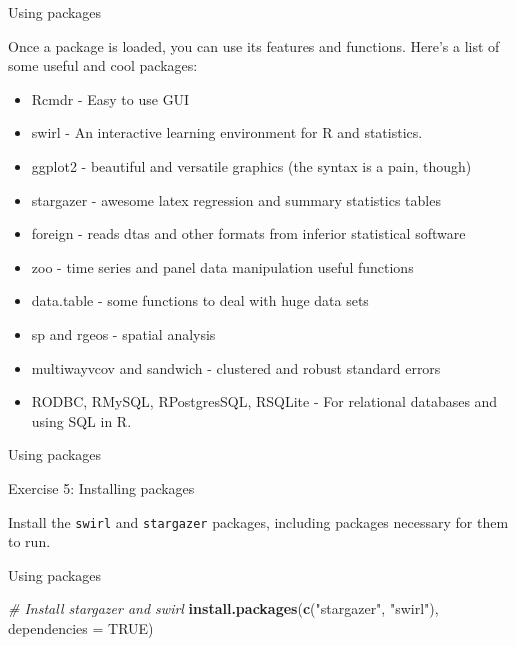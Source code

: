 \documentclass[ignorenonframetext,]{beamer}
\newenvironment{Shaded}{\begin{snugshade}}{\end{snugshade}}
\newcommand{\KeywordTok}[1]{\textcolor[rgb]{0.13,0.29,0.53}{\textbf{#1}}}
\newcommand{\DataTypeTok}[1]{\textcolor[rgb]{0.13,0.29,0.53}{#1}}
\newcommand{\StringTok}[1]{\textcolor[rgb]{0.31,0.60,0.02}{#1}}
\newcommand{\CommentTok}[1]{\textcolor[rgb]{0.56,0.35,0.01}{\textit{#1}}}
\newcommand{\OtherTok}[1]{\textcolor[rgb]{0.56,0.35,0.01}{#1}}
\newcommand{\NormalTok}[1]{#1}
\providecommand{\tightlist}{%
  \setlength{\itemsep}{0pt}\setlength{\parskip}{0pt}}
\begin{document}
\begin{frame}{Using packages}

Once a package is loaded, you can use its features and functions. Here's
a list of some useful and cool packages:

\begin{itemize}
\tightlist
\item
  Rcmdr - Easy to use GUI
\item
  swirl - An interactive learning environment for R and statistics.
\item
  ggplot2 - beautiful and versatile graphics (the syntax is a pain,
  though)
\item
  stargazer - awesome latex regression and summary statistics tables
\item
  foreign - reads dtas and other formats from inferior statistical
  software
\item
  zoo - time series and panel data manipulation useful functions
\item
  data.table - some functions to deal with huge data sets
\item
  sp and rgeos - spatial analysis
\item
  multiwayvcov and sandwich - clustered and robust standard errors
\item
  RODBC, RMySQL, RPostgresSQL, RSQLite - For relational databases and
  using SQL in R.
\end{itemize}

\end{frame}

\begin{frame}[fragile]{Using packages}

\begin{block}{Exercise 5: Installing packages}

Install the \texttt{swirl} and \texttt{stargazer} packages, including
packages necessary for them to run.

\end{block}

\end{frame}

\begin{frame}[fragile]{Using packages}

\scriptsize

\begin{Shaded}
\begin{Highlighting}[]
  \CommentTok{# Install stargazer and swirl}
  \KeywordTok{install.packages}\NormalTok{(}\KeywordTok{c}\NormalTok{(}\StringTok{"stargazer"}\NormalTok{, }\StringTok{"swirl"}\NormalTok{), }\DataTypeTok{dependencies =} \OtherTok{TRUE}\NormalTok{)}
\end{Highlighting}
\end{Shaded}

\end{frame}
\end{document}
